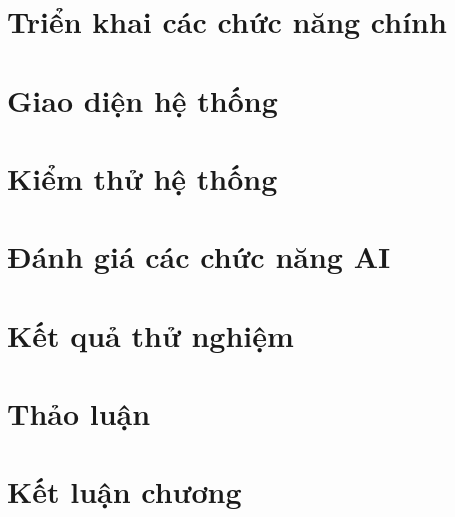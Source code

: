 \documentclass[12pt,a4paper,oneside]{report}
\begin{document}
\section{Triển khai các chức năng chính}

%


\section{Giao diện hệ thống}

%
%


\section{Kiểm thử hệ thống}

%
%


\section{Đánh giá các chức năng AI}

%


\section{Kết quả thử nghiệm}

%
%


\section{Thảo luận}



\section{Kết luận chương}
\end{document}
